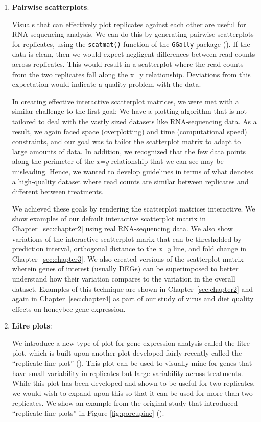 \documentclass[11pt,a4paper,oldfontcommands,openany]{memoir}
\numberwithin{equation}{section} %
\newcommand{\code}[1]{{\texttt{#1}}}
\begin{document}
\begin{enumerate}
\item \textbf{Pairwise scatterplots}:

Visuals that can effectively plot replicates against each other are useful for RNA-sequencing analysis. We can do this by generating pairwise scatterplots for replicates, using the \code{scatmat()} function of the \code{GGally} package (\citealt{ggally}). If the data is clean, then we would expect negligent differences between read counts across replicates. This would result in a scatterplot where the read counts from the two replicates fall along the x=y relationship. Deviations from this expectation would indicate a quality problem with the data.

In creating effective interactive scatterplot matrices, we were met with a similar challenge to the first goal: We have a plotting algorithm that is not tailored to deal with the vastly sized datasets like RNA-sequencing data. As a result, we again faced space (overplotting) and time (computational speed) constraints, and our goal was to tailor the scatterplot matrix to adapt to large amounts of data. In addition, we recognized that the few data points along the perimeter of the \textit{x=y} relationship that we can see may be misleading. Hence, we wanted to develop guidelines in terms of what denotes a high-quality dataset where read counts are similar between replicates and different between treatments. 

We achieved these goals by rendering the scatterplot matrices interactive. We show examples of our default interactive scatterplot matrix in Chapter~\ref{sec:chapter2} using real RNA-sequencing data. We also show variations of the interactive scatterplot marix that can be thresholded by prediction interval, orthogonal distance to the \textit{x=y} line, and fold change in Chapter~\ref{sec:chapter3}. We also created versions of the scatterplot matrix wherein genes of interest (usually DEGs) can be superimposed to better understand how their variation compares to the variation in the overall dataset. Examples of this technique are shown in Chapter~\ref{sec:chapter2} and again in Chapter~\ref{sec:chapter4} as part of our study of virus and diet quality effects on honeybee gene expression.

\item \textbf{Litre plots}:

We introduce a new type of plot for gene expression analysis called the litre plot, which is built upon another plot developed fairly recently called the ``replicate line plot'' (\citealt{jds}). This plot can be used to visually mine for genes that have small variability in replicates but large variability across treatments. While this plot has been developed and shown to be useful for two replicates, we would wish to expand upon this so that it can be used for more than two replicates. We show an example from the original study that introduced ``replicate line plots'' in Figure \ref{fig:porcupine} (\citealt{jds}).


\end{enumerate}
\end{document}
